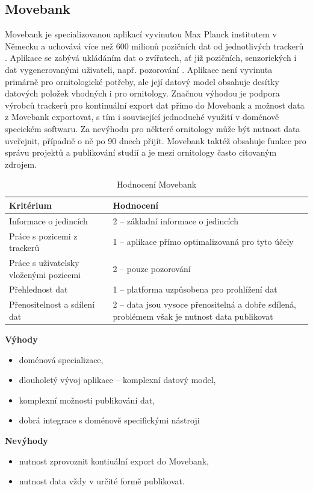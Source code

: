 \subsection{Movebank}

Movebank je specializovanou aplikací vyvinutou Max Planck institutem v Německu a uchovává více než 600 milionů pozičních dat od jednotlivých trackerů  \cite{mrozewski2018movebank}. Aplikace se zabývá ukládáním dat o zvířatech, ať již pozičních, senzorických i dat vygenerovanými uživateli, např. pozorování \cite{kranstauber2011movebank}. Aplikace není vyvinuta primárně pro ornitologické potřeby, ale její datový model obsahuje desítky datových položek vhodných i pro ornitology. Značnou výhodou je podpora výrobců trackerů pro kontinuální export dat přímo do Movebank a možnost data z Movebank exportovat, s tím i související jednoduché využití v doménově specickém softwaru. Za nevýhodu pro některé ornitology může být nutnost data uveřejnit, případně o ně po 90 dnech přijít. Movebank taktéž obsahuje funkce pro správu projektů a publikování studií a je mezi ornitology často citovaným zdrojem.

\begin{table}[H]
	\begin{tabularx}{\textwidth}{ | X | X | }
		\hline
		Kritérium                              & Hodnocení \\
		\hline			
		Informace o jedincích                  & 2 -- základní informace o jedincích          \\
		\hline
		Práce s pozicemi z trackerů            & 1 -- aplikace přímo optimalizovaná pro tyto účely          \\
		\hline
		Práce s uživatelsky vloženými pozicemi & 2 -- pouze pozorování          \\
		\hline
		Přehlednost dat                        & 1 -- platforma uzpůsobena pro prohlížení dat          \\
		\hline
		Přenositelnost a sdílení dat           & 2 -- data jsou vysoce přenositelná a dobře sdílená, problémem však je nutnost data publikovat          \\
		\hline	
	\end{tabularx}
	\caption{Hodnocení Movebank}
\end{table}

\textbf{Výhody}
\nolisttopbreak
\begin{itemize}
	\item doménová specializace,
	\item dlouholetý vývoj aplikace -- komplexní datový model,
	\item komplexní možnosti publikování dat,
	\item dobrá integrace s doménově specifickými nástroji
\end{itemize}
\textbf{Nevýhody}
\nolisttopbreak
\begin{itemize}
	\item nutnost zprovoznit kontiuální export do Movebank,
	\item nutnost data vždy v určité formě publikovat.
\end{itemize}

